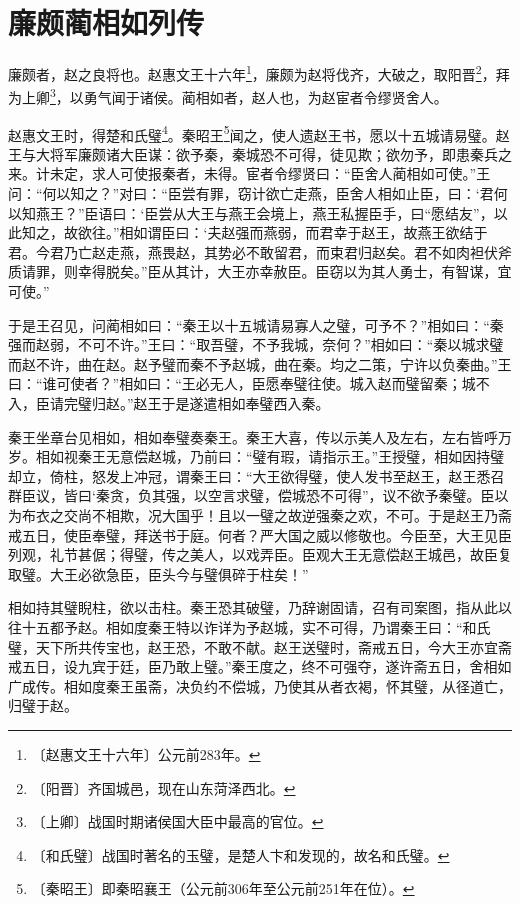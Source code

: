 \documentclass[12pt,UTF-8,openany,a4]{ctexbook}
\begin{document}
\chapter{廉颇蔺相如列传}

\begin{large}
    
    廉颇者，赵之良将也。赵惠文王十六年\footnote{〔赵惠文王十六年〕\yiwen 公元前283年。}，廉颇为赵将伐齐，大破之，取阳晋\footnote{〔阳晋〕\yiwen 齐国城邑，现在山东菏泽西北。}，拜为上卿\footnote{〔上卿〕\yiwen 战国时期诸侯国大臣中最高的官位。}，以勇气闻于诸侯。蔺相如者，赵人也，为赵宦者令缪贤舍人。
    
    赵惠文王时，得楚和氏璧\footnote{〔和氏璧〕\yiwen 战国时著名的玉璧，是楚人卞和发现的，故名和氏璧。}。秦昭王\footnote{〔秦昭王〕\yiwen 即秦昭襄王（公元前306年至公元前251年在位）。}闻之，使人遗赵王书，愿以十五城请易璧。赵王与大将军廉颇诸大臣谋：欲予秦，秦城恐不可得，徒见欺；欲勿予，即患秦兵之来。计未定，求人可使报秦者，未得。宦者令缪贤曰：“臣舍人蔺相如可使。”王问：“何以知之？”对曰：“臣尝有罪，窃计欲亡走燕，臣舍人相如止臣，曰：‘君何以知燕王？”臣语曰：‘臣尝从大王与燕王会境上，燕王私握臣手，曰“愿结友”，以此知之，故欲往。”相如谓臣曰：‘夫赵强而燕弱，而君幸于赵王，故燕王欲结于君。今君乃亡赵走燕，燕畏赵，其势必不敢留君，而束君归赵矣。君不如肉袒伏斧质请罪，则幸得脱矣。”臣从其计，大王亦幸赦臣。臣窃以为其人勇士，有智谋，宜可使。”
    
    于是王召见，问蔺相如曰：“秦王以十五城请易寡人之璧，可予不？”相如曰：“秦强而赵弱，不可不许。”王曰：“取吾璧，不予我城，奈何？”相如曰：“秦以城求璧而赵不许，曲在赵。赵予璧而秦不予赵城，曲在秦。均之二策，宁许以负秦曲。”王曰：“谁可使者？”相如曰：“王必无人，臣愿奉璧往使。城入赵而璧留秦；城不入，臣请完璧归赵。”赵王于是遂遣相如奉璧西入秦。
    
    秦王坐章台见相如，相如奉璧奏秦王。秦王大喜，传以示美人及左右，左右皆呼万岁。相如视秦王无意偿赵城，乃前曰：“璧有瑕，请指示王。”王授璧，相如因持璧却立，倚柱，怒发上冲冠，谓秦王曰：“大王欲得璧，使人发书至赵王，赵王悉召群臣议，皆曰‘秦贪，负其强，以空言求璧，偿城恐不可得”，议不欲予秦璧。臣以为布衣之交尚不相欺，况大国乎！且以一璧之故逆强秦之欢，不可。于是赵王乃斋戒五日，使臣奉璧，拜送书于庭。何者？严大国之威以修敬也。今臣至，大王见臣列观，礼节甚倨；得璧，传之美人，以戏弄臣。臣观大王无意偿赵王城邑，故臣复取璧。大王必欲急臣，臣头今与璧俱碎于柱矣！”
    
    相如持其璧睨柱，欲以击柱。秦王恐其破璧，乃辞谢固请，召有司案图，指从此以往十五都予赵。相如度秦王特以诈详为予赵城，实不可得，乃谓秦王曰：“和氏璧，天下所共传宝也，赵王恐，不敢不献。赵王送璧时，斋戒五日，今大王亦宜斋戒五日，设九宾于廷，臣乃敢上璧。”秦王度之，终不可强夺，遂许斋五日，舍相如广成传。相如度秦王虽斋，决负约不偿城，乃使其从者衣褐，怀其璧，从径道亡，归璧于赵。
    

\end{large}
\end{document}

